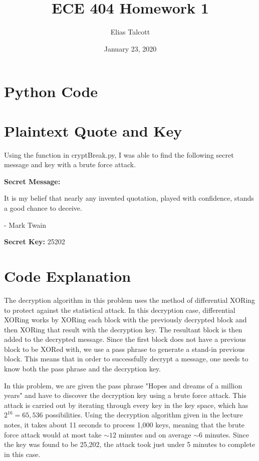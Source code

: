 \documentclass[11pt]{article}
\def \myTitle {ECE 404 Homework 1}
\def \myName {Elias Talcott}
\def \myDate {January 23, 2020}
\begin{document}
\begin{titlepage}
\title{\myTitle}
\author{\myName}
\date{\myDate}
\maketitle
\vspace{1in}
\tableofcontents
\thispagestyle{empty}
\end{titlepage}

\section{Python Code}

\pagebreak

\section{Plaintext Quote and Key}
Using the function in cryptBreak.py, I was able to find the following secret message and key with a brute force attack.

\vspace{2mm}
\textbf{Secret Message:}

It is my belief that nearly any invented quotation, played with confidence, stands a good chance to deceive.

- Mark Twain

\vspace{2mm}
\textbf{Secret Key:} 25202
\pagebreak

\section{Code Explanation}
The decryption algorithm in this problem uses the method of differential XORing to protect against the statistical attack. In this decryption case, differential XORing works by XORing each block with the previously decrypted block and then XORing that result with the decryption key. The resultant block is then added to the decrypted message. Since the first block does not have a previous block to be XORed with, we use a pass phrase to generate a stand-in previous block. This means that in order to successfully decrypt a message, one needs to know both the pass phrase and the decryption key.

In this problem, we are given the pass phrase "Hopes and dreams of a million years" and have to discover the decryption key using a brute force attack. This attack is carried out by iterating through every key in the key space, which has $2^{16} = 65,536$ possibilities. Using the decryption algorithm given in the lecture notes, it takes about 11 seconds to process 1,000 keys, meaning that the brute force attack would at most take $\sim12$ minutes and on average $\sim6$ minutes. Since the key was found to be 25,202, the attack took just under 5 minutes to complete in this case.
\end{document}
